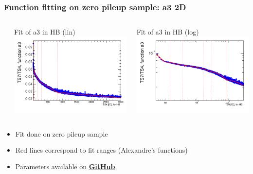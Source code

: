 \documentclass[bigger]{beamer}
\providecommand{\alert}[1]{\textbf{#1}}
\begin{document}
\begin{frame}
\frametitle{Function fitting on zero pileup sample: a3 2D}
\label{sec-3-2-14}
\begin{columns} %
\label{sec-3-2-14-1}
\begin{column}{0.55\textwidth}
\label{sec-3-2-14-1-1}

\centering
Fit of a3 in HB (lin)
\includegraphics[width=\textwidth]{fig/a3_ring0_lin.png}
\end{column}
\begin{column}{0.55\textwidth}
\label{sec-3-2-14-1-2}

\centering
Fit of a3 in HB (log)
\includegraphics[width=\textwidth]{fig/a3_ring0_log.png}
\end{column}
\end{columns}
\label{sec-3-2-14-2}
\begin{itemize}

\item Fit done on zero pileup sample
\label{sec-3-2-14-2-1}%

\item Red lines correspond to fit ranges (Alexandre's functions)
\label{sec-3-2-14-2-2}%

\item Parameters available on \href{https://github.com/edmundaberry/HcalReco/blob/master/analysis/src/fitResults.C}{\alert{GitHub}}
\label{sec-3-2-14-2-3}%
\end{itemize} %
\end{frame}
\end{document}
